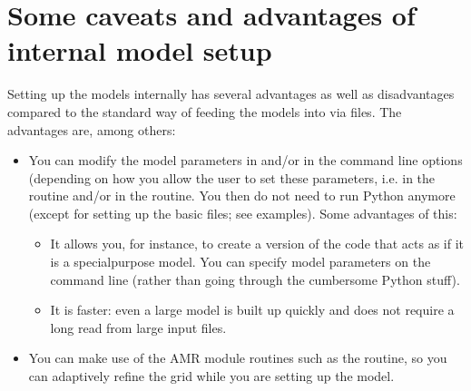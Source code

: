 \documentclass[letterpaper,10pt,english]{sphinxmanual}
\begin{document}
\section{Some caveats and advantages of internal model setup}
\label{\detokenize{internalsetup:some-caveats-and-advantages-of-internal-model-setup}}\label{\detokenize{internalsetup:sec-internalsetup-proscons}}
Setting up the models internally has several advantages as well as
disadvantages compared to the standard way of feeding the models into
 via files. The advantages are, among others:
\begin{itemize}
\item {} 
You can modify the model parameters in  and/or in the command
line options (depending on how you allow the user to set these parameters,
i.e. in the  routine and/or in the
 routine. You then do not need to run Python anymore
(except for setting up the basic files; see examples). Some advantages of
this:
\begin{itemize}
\item {} 
It allows you, for instance, to create a version of the  code
that acts as if it is a special\sphinxhyphen{}purpose model. You can specify model
parameters on the command line (rather than going through the cumbersome
Python stuff).

\item {} 
It is faster: even a large model is built up quickly and does not
require a long read from large input files.

\end{itemize}

\item {} 
You can make use of the AMR module routines such as the
 routine, so you can adaptively refine the grid while
you are setting up the model.

\end{itemize}
\end{document}
